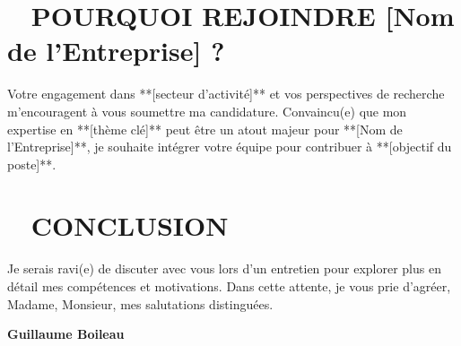 \documentclass[a4paper,10pt]{article}
\begin{document}
\section*{\textcolor{accent}{\faBuilding} ~ \textcolor{heading}{POURQUOI REJOINDRE [Nom de l'Entreprise] ?}}
Votre engagement dans **[secteur d'activité]** et vos perspectives de recherche m’encouragent à vous soumettre ma candidature.  
Convaincu(e) que mon expertise en **[thème clé]** peut être un atout majeur pour **[Nom de l’Entreprise]**, je souhaite intégrer votre équipe pour contribuer à **[objectif du poste]**.

\vspace{0.5cm}

\section*{\textcolor{accent}{\faHandshake} ~ \textcolor{heading}{CONCLUSION}}
Je serais ravi(e) de discuter avec vous lors d’un entretien pour explorer plus en détail mes compétences et motivations.  
Dans cette attente, je vous prie d’agréer, Madame, Monsieur, mes salutations distinguées.

\vspace{1cm}

\textbf{\textcolor{heading}{Guillaume Boileau}}
\end{document}
